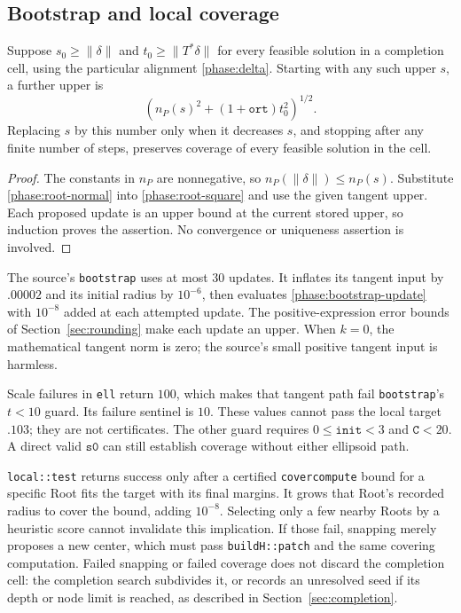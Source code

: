 \subsection{Bootstrap and local coverage}

\begin{proposition}
\label{phase:bootstrap}
Suppose \(s_0\geq\|\delta\|\) and
\(t_0\geq\|T^*\delta\|\) for every feasible solution in a completion
cell, using the particular alignment \eqref{phase:delta}.  Starting
with any such upper \(s\), a further upper is
\begin{equation}
 \left(n_P(s)^2+(1+\mathtt{ort})t_0^2\right)^{1/2}.
 \label{phase:bootstrap-update}
\end{equation}
Replacing \(s\) by this number only when it decreases \(s\), and
stopping after any finite number of steps, preserves coverage of
every feasible solution in the cell.
\end{proposition}

\begin{proof}
The constants in \(n_P\) are nonnegative, so
\(n_P(\|\delta\|)\leq n_P(s)\).  Substitute
\eqref{phase:root-normal} into \eqref{phase:root-square} and use
the given tangent upper.  Each proposed update is an upper bound
at the current stored upper, so induction proves the assertion.
No convergence or uniqueness assertion is involved.
\end{proof}

The source's \texttt{bootstrap} uses at most \(30\) updates.  It
inflates its tangent input by \(.00002\) and its initial radius by
\(10^{-6}\), then evaluates \eqref{phase:bootstrap-update} with
\(10^{-8}\) added at each attempted update.  The positive-expression
error bounds of Section~\ref{sec:rounding} make each update an upper.
When \(k=0\), the mathematical tangent norm is zero; the source's
small positive tangent input is harmless.

Scale failures in \texttt{ell} return \(100\), which makes that
tangent path fail \texttt{bootstrap}'s \(t<10\) guard.  Its failure
sentinel is \(10\).  These values cannot pass the local target
\(.103\); they are not certificates.  The other guard requires
\(0\leq\mathtt{init}<3\) and \(\mathtt C<20\).  A direct valid
\(\mathtt{s0}\) can still establish coverage without either
ellipsoid path.

\texttt{local::test} returns success only after a certified
\texttt{covercompute} bound for a specific Root fits the target with
its final margins.  It grows that Root's recorded radius to cover
the bound, adding \(10^{-8}\).  Selecting only a few nearby Roots
by a heuristic score cannot invalidate this implication.  If
those fail, snapping merely proposes a new center, which must pass
\texttt{buildH::patch} and the same covering computation.  Failed
snapping or failed coverage does not discard the completion cell:
the completion search subdivides it, or records an unresolved
seed if its depth or node limit is reached, as described in
Section~\ref{sec:completion}.

